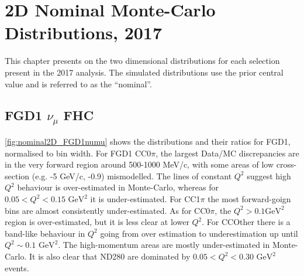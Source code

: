\chapter{2D Nominal Monte-Carlo Distributions, 2017}
\label{chap:nominal_mc_2017}
This chapter presents on the two dimensional \pmu \cosmu distributions for each selection present in the 2017 analysis. The simulated distributions use the prior central value and is referred to as the ``nominal''.

\section{FGD1 $\nu_\mu$ FHC}
\autoref{fig:nominal2D_FGD1numu} shows the \pmu \cosmu distributions and their ratios for FGD1, normalised to bin width. For FGD1 CC0$\pi$, the largest Data/MC discrepancies are in the very forward region around 500-1000 MeV/c, with some areas of low cross-section  (e.g. -5 GeV/c, -0.9) mismodelled. The lines of constant $Q^2$ suggest high $Q^2$ behaviour is over-estimated in Monte-Carlo, whereas for $0.05 < Q^2 < 0.15 \text{ GeV}^2$ it is under-estimated. For CC1$\pi$ the most forward-goign bins are almost consistently under-estimated. As for CC0$\pi$, the $Q^2 >0.1 \text{GeV}^2$ region is over-estimated, but it is less clear at lower $Q^2$. For CCOther there is a band-like behaviour in $Q^2$ going from over estimation to underestimation up until $Q^2\sim0.1\text{ GeV}^2$. The high-momentum areas are mostly under-estimated in Monte-Carlo. It is also clear that ND280 are dominated by $0.05 < Q^2 < 0.30\text{ GeV}^2$ events.

